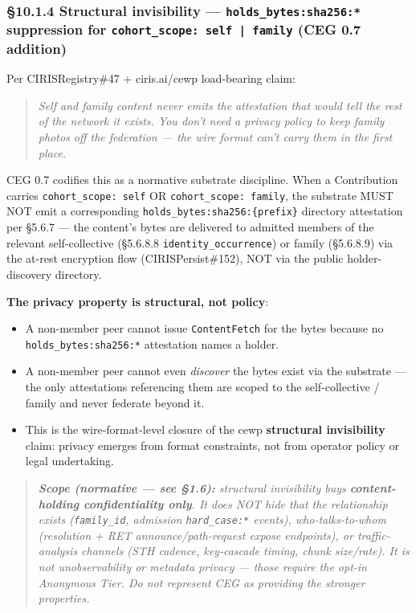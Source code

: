 \documentclass[11pt]{article}
\begin{document}
\subsubsection*{§10.1.4 Structural invisibility — \texttt{holds\_bytes:sha256:*} suppression for \texttt{cohort\_scope: self | family} (CEG 0.7 addition)}


Per CIRISRegistry\#47 + ciris.ai/cewp load-bearing claim:


\begin{quote}\itshape Self and family content never emits the attestation that would tell the rest of the network it exists. You don't need a privacy policy to keep family photos off the federation — the wire format can't carry them in the first place.\end{quote}


CEG 0.7 codifies this as a normative substrate discipline. When a Contribution carries \texttt{cohort\_scope: self} OR \texttt{cohort\_scope: family}, the substrate MUST NOT emit a corresponding \texttt{holds\_bytes:sha256:\{prefix\}} directory attestation per §5.6.7 — the content's bytes are delivered to admitted members of the relevant self-collective (§5.6.8.8 \texttt{identity\_occurrence}) or family (§5.6.8.9) via the at-rest encryption flow (CIRISPersist\#152), NOT via the public holder-discovery directory.


\textbf{The privacy property is structural, not policy}:


\begin{itemize}\setlength\itemsep{0pt}
\item A non-member peer cannot issue \texttt{ContentFetch} for the bytes because no \texttt{holds\_bytes:sha256:*} attestation names a holder.
\item A non-member peer cannot even \textit{discover} the bytes exist via the substrate — the only attestations referencing them are scoped to the self-collective / family and never federate beyond it.
\item This is the wire-format-level closure of the cewp \textbf{structural invisibility} claim: privacy emerges from format constraints, not from operator policy or legal undertaking.
\end{itemize}


\begin{quote}\itshape \textbf{Scope (normative — see §1.6):} structural invisibility buys \textbf{content-holding confidentiality only}. It does NOT hide that the relationship exists (\texttt{family\_id}, admission \texttt{hard\_case:*} events), who-talks-to-whom (resolution + RET announce/path-request expose endpoints), or traffic-analysis channels (STH cadence, key-cascade timing, chunk size/rate). It is not unobservability or metadata privacy — those require the opt-in Anonymous Tier. Do not represent CEG as providing the stronger properties.\end{quote}
\end{document}

